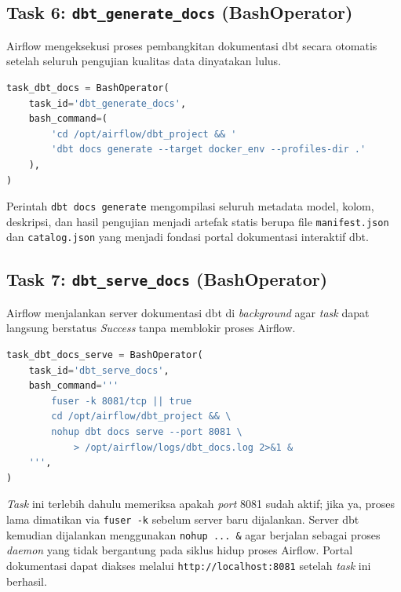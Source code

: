 \subsection*{Task 6: \texttt{dbt\_generate\_docs} (BashOperator)}

Airflow mengeksekusi proses pembangkitan dokumentasi dbt secara otomatis setelah seluruh
pengujian kualitas data dinyatakan lulus.

\begin{lstlisting}[language=Python, caption=Definisi Task dbt\_generate\_docs]
task_dbt_docs = BashOperator(
    task_id='dbt_generate_docs',
    bash_command=(
        'cd /opt/airflow/dbt_project && '
        'dbt docs generate --target docker_env --profiles-dir .'
    ),
)
\end{lstlisting}

Perintah \texttt{dbt docs generate} mengompilasi seluruh metadata model, kolom, deskripsi,
dan hasil pengujian menjadi artefak statis berupa file \texttt{manifest.json} dan
\texttt{catalog.json} yang menjadi fondasi portal dokumentasi interaktif dbt.

\subsection*{Task 7: \texttt{dbt\_serve\_docs} (BashOperator)}

Airflow menjalankan server dokumentasi dbt di \textit{background} agar \textit{task} dapat
langsung berstatus \textit{Success} tanpa memblokir proses Airflow.

\begin{lstlisting}[language=Python, caption=Definisi Task dbt\_serve\_docs]
task_dbt_docs_serve = BashOperator(
    task_id='dbt_serve_docs',
    bash_command='''
        fuser -k 8081/tcp || true
        cd /opt/airflow/dbt_project && \
        nohup dbt docs serve --port 8081 \
            > /opt/airflow/logs/dbt_docs.log 2>&1 &
    ''',
)
\end{lstlisting}

\textit{Task} ini terlebih dahulu memeriksa apakah \textit{port} 8081 sudah aktif; jika ya,
proses lama dimatikan via \texttt{fuser -k} sebelum server baru dijalankan. Server dbt
kemudian dijalankan menggunakan \texttt{nohup ... \&} agar berjalan sebagai proses
\textit{daemon} yang tidak bergantung pada siklus hidup proses Airflow. Portal dokumentasi
dapat diakses melalui \texttt{http://localhost:8081} setelah \textit{task} ini berhasil.
